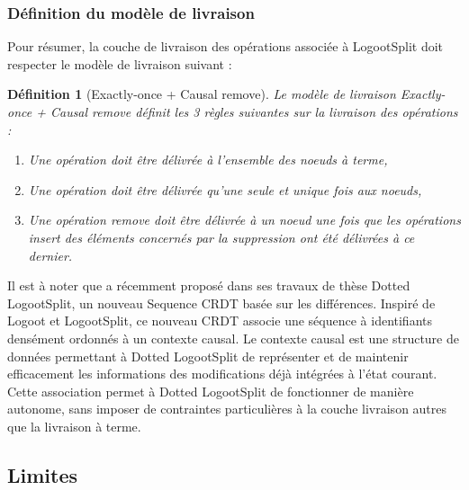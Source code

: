 \documentclass[12pt]{thesul}
\newtheorem{definition}{Définition}
\begin{document}

\subsubsection{Définition du modèle de livraison}

Pour résumer, la couche de livraison des opérations associée à LogootSplit doit respecter le modèle de livraison suivant :

\begin{definition}[Exactly-once + Causal remove]
  \label{def:ls-delivery-model}
  Le modèle de livraison \emph{Exactly-once + Causal remove} définit les 3 règles suivantes sur la livraison des opérations :
  \begin{enumerate}
    \item Une opération doit être délivrée à l'ensemble des noeuds à terme,
    \item Une opération doit être délivrée qu'une seule et unique fois aux noeuds,
    \item Une opération \emph{remove} doit être délivrée à un noeud une fois que les opérations \emph{insert} des éléments concernés par la suppression ont été délivrées à ce dernier.
  \end{enumerate}
\end{definition}

Il est à noter que \textcite{2021-these-vic} a récemment proposé dans ses travaux de thèse Dotted LogootSplit, un nouveau Sequence \ac{CRDT} basée sur les différences.
Inspiré de Logoot et LogootSplit, ce nouveau \ac{CRDT} associe une séquence à identifiants densément ordonnés à un contexte causal.
Le contexte causal est une structure de données permettant à Dotted LogootSplit de représenter et de maintenir efficacement les informations des modifications déjà intégrées à l'état courant.
Cette association permet à Dotted LogootSplit de fonctionner de manière autonome, sans imposer de contraintes particulières à la couche livraison autres que la livraison à terme.

\subsection{Limites}
\end{document}

